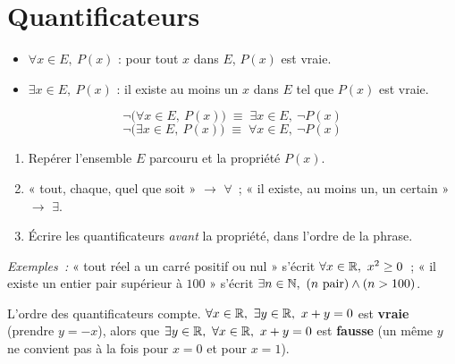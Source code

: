 \section{Quantificateurs}

\begin{defn}
\begin{itemize}
  \item $\forall x \in E,\ P(x)$ : \og pour tout $x$ dans $E$, $P(x)$ est vraie.\fg
  \item $\exists x \in E,\ P(x)$ : \og il existe au moins un $x$ dans $E$ tel que
        $P(x)$ est vraie.\fg
\end{itemize}
\end{defn}

\begin{prop}
$$\lnot\bigl(\forall x \in E,\ P(x)\bigr) \;\equiv\; \exists x \in E,\ \lnot P(x)$$
$$\lnot\bigl(\exists x \in E,\ P(x)\bigr) \;\equiv\; \forall x \in E,\ \lnot P(x)$$
\end{prop}

\begin{methode}
\begin{enumerate}
  \item Repérer l'ensemble $E$ parcouru et la propriété $P(x)$.
  \item « tout, chaque, quel que soit » $\to$ $\forall$~; « il existe, au moins un, un certain » $\to$ $\exists$.
  \item Écrire les quantificateurs \emph{avant} la propriété, dans l'ordre de la phrase.
\end{enumerate}
\emph{Exemples~:} « tout réel a un carré positif ou nul » s'écrit
$\forall x\in\mathbb{R},\ x^2\geq0$~; « il existe un entier pair supérieur à $100$ »
s'écrit $\exists n\in\mathbb{N},\ (n \text{ pair}) \land (n>100)$.
\end{methode}

\begin{attention}
L'ordre des quantificateurs compte.
$\forall x\in\mathbb{R},\ \exists y\in\mathbb{R},\ x+y=0$ est \textbf{vraie} (prendre $y=-x$),
alors que $\exists y\in\R,\ \forall x\in\R,\ x+y=0$ est \textbf{fausse}
(un même $y$ ne convient pas à la fois pour $x=0$ et pour $x=1$).
\end{attention}

